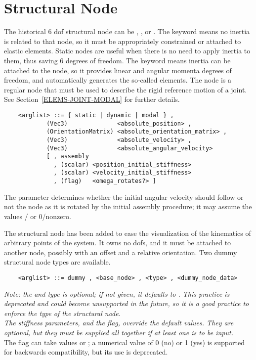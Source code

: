 \section{Structural Node}\label{sec:NODE-STRUCT}
The historical 6 dof structural node can be ,
,  or .
The  keyword means no inertia is related to that node, 
so it must be appropriately constrained or attached to elastic elements.
Static nodes are useful when there is no need to apply inertia
to them, thus saving 6 degrees of freedom.
The  keyword means inertia can be attached to the node, 
so it provides linear and angular momenta degrees of freedom, 
and automatically generates the so-called 
elements.
The  node is a regular  node that must be used 
to describe the rigid reference motion of a  joint.
See Section~\ref{ELEMS-JOINT-MODAL} for further details.
\begin{verbatim}
    <arglist> ::= { static | dynamic | modal } ,
            (Vec3)              <absolute_position> ,
            (OrientationMatrix) <absolute_orientation_matrix> ,
            (Vec3)              <absolute_velocity> ,
            (Vec3)              <absolute_angular_velocity>
            [ , assembly
              , (scalar) <position_initial_stiffness>
              , (scalar) <velocity_initial_stiffness>
              , (flag)   <omega_rotates?> ]
\end{verbatim}
The  parameter determines whether 
the initial angular velocity should follow or not the node 
as it is rotated by the initial assembly procedure; it may assume 
the values / or 0/nonzero.

\noindent
The  structural node has been added to ease the visualization of
the kinematics of arbitrary points of the system. 
It owns no dofs, and it must be attached to another node, possibly with an
offset and a relative orientation.
Two dummy structural node types are available.
\begin{verbatim}
    <arglist> ::= dummy , <base_node> , <type> , <dummy_node_data>
\end{verbatim}
{\em 
    Note: the  and  type is optional; if not given,
    it defaults to . 
    This practice is deprecated and could become unsupported in the future, 
    so it is a good practice to enforce the type of the structural node. \\
    The stiffness parameters, and the  flag, 
    override the default values. 
    They are optional, but they must be supplied all together if at least
    one is to be input.
} \\
The  flag can take values  or ;
a numerical value of 0 (no) or 1 (yes) is supported for backwards
compatibility, but its use is deprecated.

